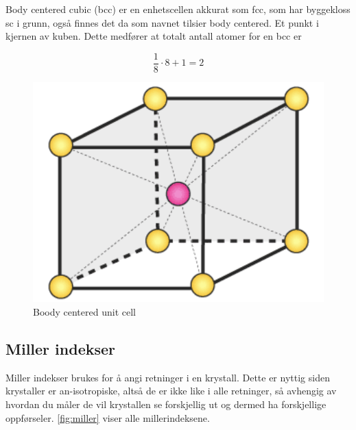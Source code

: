 Body centered cubic (bcc) er en enhetscellen akkurat som fcc, som har byggekloss sc i grunn, også finnes det da som navnet tilsier body centered. Et punkt i kjernen av kuben. Dette medfører at totalt antall atomer for en bcc er

\begin{equation*}
    \frac{1}{8}\cdot 8 + 1 = 2
\end{equation*}

\begin{figure}[!htb]
    \centering
    \includegraphics[scale=0.5]{Bilder/SamtaleTema4/bcc.png}
    \caption{Boody centered unit cell}
    \label{fig:bcc}
\end{figure}

\subsection{Miller indekser}
\label{sec:tema4_6}
Miller indekser brukes for å angi retninger i en krystall. Dette er nyttig siden krystaller er an-isotropiske, altså de er ikke like i alle retninger, så avhengig av hvordan du måler de vil krystallen se forskjellig ut og dermed ha forskjellige oppførseler. \autoref{fig:miller} viser alle millerindeksene.

